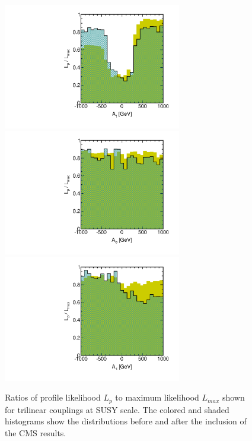 \begin{figure}[htbp]
\begin{center}
\includegraphics[height=5.5cm]{figs/fig_A_t.pdf} 
\includegraphics[height=5.5cm]{figs/fig_A_b.pdf} \\
\includegraphics[height=5.5cm]{figs/fig_A_tau.pdf}
\caption{Ratios of profile likelihood $L_p$ to maximum likelihood $L_{max}$ shown for trilinear couplings at SUSY scale.  The colored and shaded histograms show the distributions before and after the inclusion of the CMS results.}
\label{fig:LRwcms_A}
\end{center}
\end{figure}

